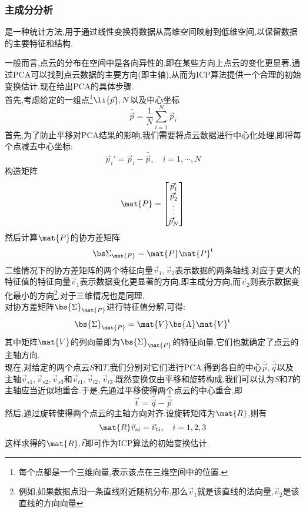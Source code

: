 \documentclass{ctexart}
\begin{document}
\subsubsection{主成分分析}
\begin{definition}[主成分分析]
    是一种统计方法,用于通过线性变换将数据从高维空间映射到低维空间,以保留数据的主要特征和结构.
\end{definition}
一般而言,点云的分布在空间中是各向异性的,即在某些方向上点云的变化更显著.通过PCA可以找到点云数据的主要方向(即主轴),从而为ICP算法提供一个合理的初始变换估计.现在给出PCA的具体步骤.\\
\indent 首先,考虑给定的一组点\footnote{每个点都是一个三维向量,表示该点在三维空间中的位置.}$\li{\vec p},N$以及中心坐标
\[\bar{\vec{p}}=\dfrac1N\sum_{i=1}^{N}\vec{p}_i\]
首先,为了防止平移对PCA结果的影响,我们需要将点云数据进行中心化处理,即将每个点减去中心坐标:
\[\vec{p}_i'=\vec{p}_i-\bar{\vec{p}},\quad i=1,\cdots,N\]
构造矩阵
\[\mat{P}=\begin{bmatrix}
    \vec{p}_1'\\\vec{p}_2'\\\vdots\\\vec{p}_N'
\end{bmatrix}\]
然后计算$\mat{P}$的协方差矩阵
\[\bs\Sigma_{\mat{P}}=\mat{P}\mat{P}^{\text{t}}\]
二维情况下的协方差矩阵的两个特征向量$\vec{v}_1,\vec{v}_2$表示数据的两条轴线.对应于更大的特征值的特征向量$\vec{v}_1$表示数据变化更显著的方向,即主成分方向,而$\vec{v}_2$则表示数据变化最小的方向\footnote{例如,如果数据点沿一条直线附近随机分布,那么$\vec{v}_1$就是该直线的法向量,$\vec{v}_2$是该直线的方向向量}.对于三维情况也是同理.\\
\indent 对协方差矩阵$\bs{\Sigma}_{\mat{P}}$进行特征值分解,可得:
\[\bs{\Sigma}_{\mat{P}}=\mat{V}\bs{\Lambda}\mat{V}^{\text{t}}\]
其中矩阵$\mat{V}$的列向量即为$\bs{\Sigma}_{\mat{P}}$的特征向量,它们也就确定了点云的主轴方向.\\
\indent 现在,对给定的两个点云$S$和$T$,我们分别对它们进行PCA,得到各自的中心$\bar{\vec{p}},\bar{\vec{q}}$以及主轴$\vec{v}_{s1},\vec{v}_{s2},\vec{v}_{s3}$和$\vec{v}_{t1},\vec{v}_{t2},\vec{v}_{t3}$.既然变换仅由平移和旋转构成,我们可以认为$S$和$T$的主轴应当近似地重合.于是,先通过平移使得两个点云的中心重合,即
\[\vec{t}=\bar{\vec{q}}-\bar{\vec{p}}\]
然后,通过旋转使得两个点云的主轴方向对齐.设旋转矩阵为$\mat{R}$,则有
\[\mat{R}\vec{v}_{si}=\vec{v}_{ti},\quad i=1,2,3\]
这样求得的$\mat{R},\vec{t}$即可作为ICP算法的初始变换估计.
\end{document}
